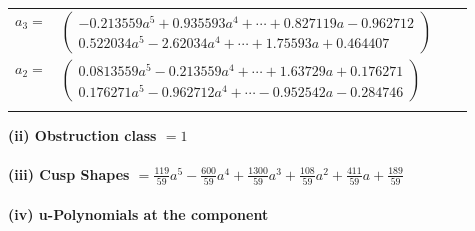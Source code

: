 \documentclass[1p]{elsarticle_modified}
\theoremstyle{definition}
\begin{document}
\begin{tabular}{m{7pt} m{180pt} m{7pt} m{180pt} }
\flushright $a_{3}=$&$\begin{pmatrix}-0.213559 a^{5}+0.935593 a^{4}+\cdots+0.827119 a-0.962712\\0.522034 a^{5}-2.62034 a^{4}+\cdots+1.75593 a+0.464407\end{pmatrix}$ \\
\flushright $a_{2}=$&$\begin{pmatrix}0.0813559 a^{5}-0.213559 a^{4}+\cdots+1.63729 a+0.176271\\0.176271 a^{5}-0.962712 a^{4}+\cdots-0.952542 a-0.284746\end{pmatrix}$\\&\end{tabular}
\flushleft \textbf{(ii) Obstruction class $= 1$}\\~\\
\flushleft \textbf{(iii) Cusp Shapes $= \frac{119}{59} a^5-\frac{600}{59} a^4+\frac{1300}{59} a^3+\frac{108}{59} a^2+\frac{411}{59} a+\frac{189}{59}$}\\~\\
\newpage\renewcommand{\arraystretch}{1}
\flushleft \textbf{(iv) u-Polynomials at the component}\newline \\
\end{document}
